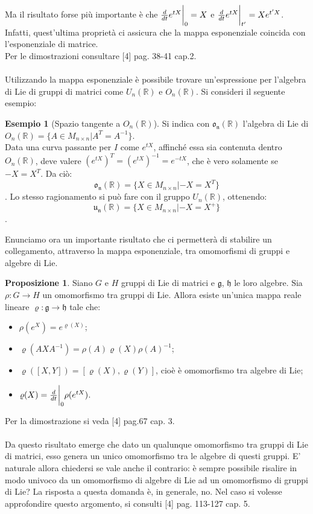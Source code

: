\documentclass[12pt,a4paper]{report}
\theoremstyle{definition}
\newtheorem{Prop}[Def]{Proposizione}
\theoremstyle{definition}
\newtheorem{Ex}[Def]{Esempio}
\theoremstyle{definition}
\theoremstyle{definition}
\begin{document}
Ma il risultato forse più importante è che ${d\over dt}e^{tX}\bigg{\rvert}_0=X$ e ${d\over dt}e^{tX}\bigg{\rvert}_{t'}=Xe^{t'X}$.\\
Infatti, quest'ultima proprietà ci assicura che la mappa esponenziale coincida con l'esponenziale di matrice.\\
Per le dimostrazioni consultare [4] pag. 38-41 cap.2.\\
\\
Utilizzando la mappa esponenziale è possibile trovare un'espressione per l'algebra di Lie di gruppi di matrici come $U_n(\mathbb{R})$ e $O_n(\mathbb{R})$. Si consideri il seguente esempio:
\begin{Ex}[Spazio tangente a $O_n(\mathbb{R})$]
	Si indica con $\mathfrak{o_n(\mathbb{R})}$ l'algebra di Lie di $O_n(\mathbb{R})=\{A\in M_{n\times n}|A^T=A^{-1}\}$.\\
	Data una curva passante per $I$ come $e^{tX}$, affinché essa sia contenuta dentro $O_n(\mathbb{R})$, deve valere $(e^{tX})^T=(e^{tX})^{-1}=e^{-tX}$, che è vero solamente se $-X=X^T$. Da ciò: $$\mathfrak{o_n(\mathbb{R})}=\{X\in M_{n\times n}|-X=X^T\}$$.
	Lo stesso ragionamento si può fare con il gruppo $U_n(\mathbb{R})$, ottenendo: $$\mathfrak{u_n(\mathbb{R})}=\{X\in M_{n\times n}|-X=X^+\}$$.
\end{Ex}
Enunciamo ora un importante risultato che ci permetterà di stabilire un collegamento, attraverso la mappa esponenziale, tra omomorfismi di gruppi e algebre di Lie.
\begin{Prop} \label{Prop: 2.4.1}
	Siano $G$ e $H$ gruppi di Lie di matrici e $\mathfrak{g}$, $\mathfrak{h}$ le loro algebre. Sia $\rho:G\rightarrow H$ un omomorfismo tra gruppi di Lie. Allora esiste un'unica mappa reale lineare $\varrho:\mathfrak{g}\rightarrow\mathfrak{h}$ tale che:
	\begin{itemize}
		\item $\rho(e^X)=e^{\varrho(X)}$; 
		\item $\varrho(AXA^{-1})=\rho(A)\varrho(X)\rho(A)^{-1}$;
		\item $\varrho([X,Y])=[\varrho(X),\varrho(Y)]$, cioè è omomorfismo tra algebre di Lie;
		\item $\varrho(X)={d\over dt}\bigg{\rvert}_0\rho(e^{tX})$.
	\end{itemize}
\end{Prop}
Per la dimostrazione si veda [4] pag.67 cap. 3.\\
\\
Da questo risultato emerge che dato un qualunque omomorfismo tra gruppi di Lie di matrici, esso genera un unico omomorfismo tra le algebre di questi gruppi. E' naturale allora chiedersi se vale anche il contrario: è sempre possibile risalire in modo univoco da un omomorfismo di algebre di Lie ad un omomorfismo di gruppi di Lie?
La risposta a questa domanda è, in generale, no. Nel caso si volesse approfondire questo argomento, si consulti [4] pag. 113-127 cap. 5.
\end{document}

